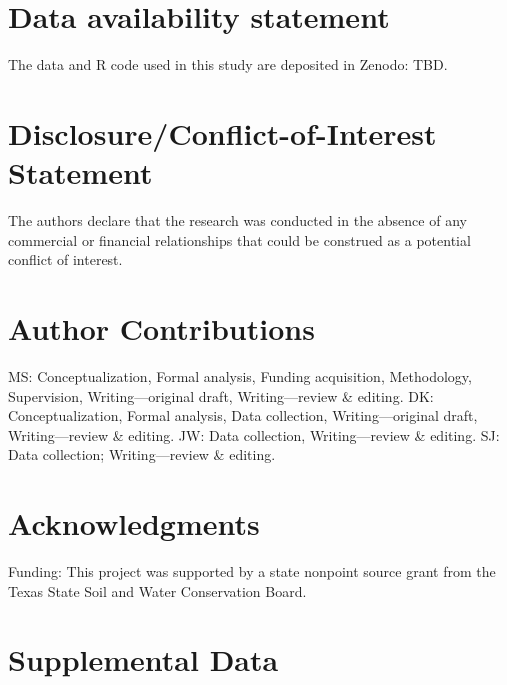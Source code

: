 \documentclass[utf8]{FrontiersinHarvard}
\begin{document}
\hypertarget{data-availability-statement}{%
\section*{Data availability statement}\label{data-availability-statement}}

The data and R code used in this study are deposited in Zenodo: TBD.

\hypertarget{disclosureconflict-of-interest-statement}{%
\section*{Disclosure/Conflict-of-Interest Statement}\label{disclosureconflict-of-interest-statement}}

The authors declare that the research was conducted in the absence of any
commercial or financial relationships that could be construed as a potential
conflict of interest.

\hypertarget{author-contributions}{%
\section*{Author Contributions}\label{author-contributions}}

MS: Conceptualization, Formal analysis, Funding acquisition, Methodology, Supervision, Writing---original draft, Writing---review \& editing.
DK: Conceptualization, Formal analysis, Data collection, Writing---original draft, Writing---review \& editing.
JW: Data collection, Writing---review \& editing.
SJ: Data collection; Writing---review \& editing.

\hypertarget{acknowledgments}{%
\section*{Acknowledgments}\label{acknowledgments}}

Funding: This project was supported by a state nonpoint source grant from the Texas State Soil and Water Conservation Board.

\hypertarget{supplemental-data}{%
\section*{Supplemental Data}\label{supplemental-data}}
\end{document}

